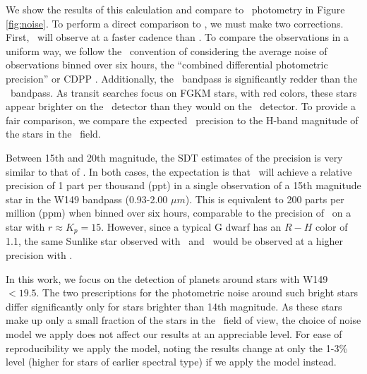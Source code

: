 We show the results of this calculation and compare to \kep\ photometry in Figure \ref{fig:noise}.
To perform a direct comparison to \kep, we must make two corrections. 
First, \WF\ will observe at a faster cadence than \kep. 
To compare the observations in a uniform way, we follow the \kep\ convention of considering
the average noise of observations binned over six hours, the ``combined differential 
photometric precision'' or CDPP \citep{Christiansen12}.
Additionally, the \WF\ bandpass is significantly redder than the \kep\ bandpass. 
As transit searches focus on FGKM stars, with red colors, these stars appear brighter on the
\WF\ detector than they would on the \kep\ detector.
To provide a fair comparison, we compare the expected \WF\ precision to the H-band magnitude
of the stars in the \kep\ field.

Between 15th and 20th magnitude, the SDT estimates of the precision is very similar to
that of \citet{Gould15}.
In both cases, the expectation is that \WF\ will achieve a relative precision of 1 part per 
thousand (ppt) in a single observation of a 15th magnitude star in the 
W149 bandpass (0.93-2.00 $\mu m$). This is equivalent to 200 parts per million 
(ppm) when binned over six hours, comparable to the precision of \kep\ on a star
with $r \approx K_p =15$. However, since a typical G dwarf has an $R-H$ color of 1.1, 
the same Sunlike star observed with \kep\ and \WF\ would be observed at
a higher precision with \WF.

In this work, we focus on the detection of planets around stars with W149 $< 19.5$. The two
prescriptions for the photometric noise around such bright stars differ significantly only for stars
brighter than 14th magnitude. 
As these stars make up only a small fraction of the stars in the \WF\ field of view, the choice of
noise model we apply does not affect our results at an appreciable level. 
For ease of reproducibility we apply the \citet{Gould15} model, noting the results change at only
the 1-3\% level (higher for stars of earlier spectral type) if we apply the \citet{Spergel15} model
instead.

